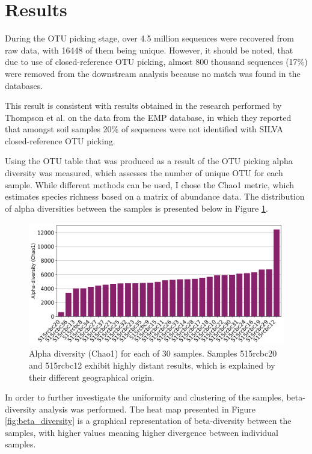 \documentclass[12pt,twocolumn]{article}
\begin{document}
\section{Results} 
During the OTU picking stage, over 4.5 million sequences were recovered from raw data, with 16448 of them being unique. However, it should be noted, that due to use of closed-reference OTU picking, almost 800 thousand sequences (17\%) were removed from the downstream analysis because no match was found in the databases. 
\par
This result is consistent with results obtained in the research performed by Thompson et al.\cite{Thompson2017} on the data from the EMP database, in which they reported that amongst soil samples 20\% of sequences were not identified with SILVA closed-reference OTU picking.
\par
Using the OTU table that was produced as a result of the OTU picking alpha diversity was measured, which assesses the number of unique OTU for each sample. While different methods can be used, I chose the Chao1 metric, which estimates species richness based on a matrix of abundance data. 
The distribution of alpha diversities between the samples is presented below in Figure \ref{fig:alpha_diversity}.
\begin{figure}[ht!] %
	\includegraphics[width=\linewidth]{chao1_alpha.png}
	\caption{Alpha diversity (Chao1) for each of 30 samples. Samples 515rcbc20 and 515rcbc12 exhibit highly distant results, which is explained by their different geographical origin.}
	\label{fig:alpha_diversity}
\end{figure}
\par
In order to further investigate the uniformity and clustering of the samples, beta-diversity analysis was performed. The heat map presented in Figure \ref{fig:beta_diversity} is a graphical representation of beta-diversity between the samples, with higher values meaning higher divergence between individual samples.
\end{document}
